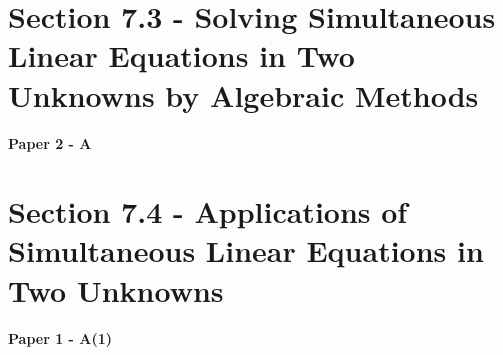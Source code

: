 \documentclass[12pt, a4paper]{article}
\begin{document}
\section*{Section 7.3 - Solving Simultaneous Linear Equations in Two Unknowns by Algebraic Methods}\label{section:2-7-3}

\textbf{Paper 2 - A}
\begin{enumx}[label=\arabic*.,start=1]
\item {}\label{DSE2012-CoreP2-Q05} 
\item {}\label{DSE2015-CoreP2-Q03} 
\item {}\label{DSE2016-CoreP2-Q05} 
\item {}\label{DSE2019-CoreP2-Q03} 
\end{enumx}




\section*{Section 7.4 - Applications of Simultaneous Linear Equations in Two Unknowns }\label{section:2-7-4}

\textbf{Paper 1 - A(1)}
\begin{enumx}[label=\arabic*.,start=5]
\item {}\label{DSE2013-CoreP1-Q04} 
\item {}\label{DSE2021-CoreP1-Q05} 
\item {}\label{DSE2023-CoreP1-Q05} 
\end{enumx}
\end{document}
